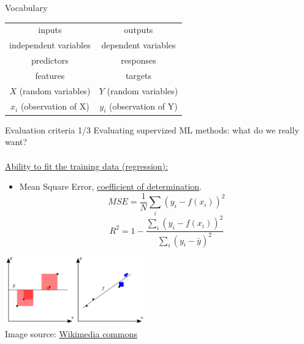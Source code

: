 \documentclass{beamer}
\begin{document}
\begin{frame}{Vocabulary}
\begin{center}
\begin{tabular}{cc}
inputs & outputs\\
independent variables & dependent variables\\
predictors & responses\\
features & targets\\
$X$ (random variables) & $Y$ (random variables)\\
$x_i$ (observation of X) & $y_i$ (observation of Y)
\end{tabular}
\end{center}
\end{frame}

\begin{frame}{Evaluation criteria 1/3}
Evaluating supervized ML methods: what do we really want?\\
~\\
\underline{Ability to fit the training data (regression):}
\begin{itemize}
\item Mean Square Error, \href{https://en.wikipedia.org/wiki/Coefficient_of_determination}{coefficient of determination}.
$$MSE = \frac{1}{N}\sum_i \left(y_i - f(x_i)\right)^2$$
$$R^2 = 1-\frac{\sum_i \left(y_i - f(x_i)\right)^2}{\sum_i \left(y_i - \bar{y}\right)^2}$$
\end{itemize}
\begin{center}
\includegraphics[width=6cm]{img/R2.png}\\
\tiny Image source: \href{https://commons.wikimedia.org/wiki/File:Coefficient_of_Determination.svg}{Wikimedia commons}
\end{center}
\end{frame}
\end{document}
